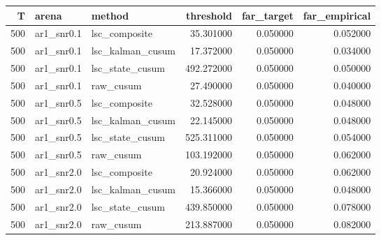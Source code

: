 \begin{tabular}{rllrrr}
\toprule
T & arena & method & threshold & far_target & far_empirical \\
\midrule
500 & ar1_snr0.1 & lsc_composite & 35.301000 & 0.050000 & 0.052000 \\
500 & ar1_snr0.1 & lsc_kalman_cusum & 17.372000 & 0.050000 & 0.034000 \\
500 & ar1_snr0.1 & lsc_state_cusum & 492.272000 & 0.050000 & 0.050000 \\
500 & ar1_snr0.1 & raw_cusum & 27.490000 & 0.050000 & 0.040000 \\
500 & ar1_snr0.5 & lsc_composite & 32.528000 & 0.050000 & 0.048000 \\
500 & ar1_snr0.5 & lsc_kalman_cusum & 22.145000 & 0.050000 & 0.048000 \\
500 & ar1_snr0.5 & lsc_state_cusum & 525.311000 & 0.050000 & 0.054000 \\
500 & ar1_snr0.5 & raw_cusum & 103.192000 & 0.050000 & 0.062000 \\
500 & ar1_snr2.0 & lsc_composite & 20.924000 & 0.050000 & 0.062000 \\
500 & ar1_snr2.0 & lsc_kalman_cusum & 15.366000 & 0.050000 & 0.048000 \\
500 & ar1_snr2.0 & lsc_state_cusum & 439.850000 & 0.050000 & 0.078000 \\
500 & ar1_snr2.0 & raw_cusum & 213.887000 & 0.050000 & 0.082000 \\
\bottomrule
\end{tabular}
